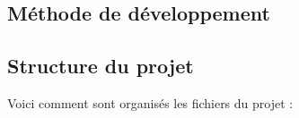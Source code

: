 \documentclass[a4paper, 12pt, twoside]{article}
\begin{document}
    
    
    \tableofcontents
    \listoffigures
    \listoftables
    \newpage
    
    \begin{indt}{\section{Méthode de développement}}%
        \begin{indt}{\subsection{Structure du projet}} %
            Voici comment sont organisés les fichiers du projet :
            \begin{figure}[H]%
                \centering
            

\end{figure}
\end{indt}
\end{indt}
\end{document}

